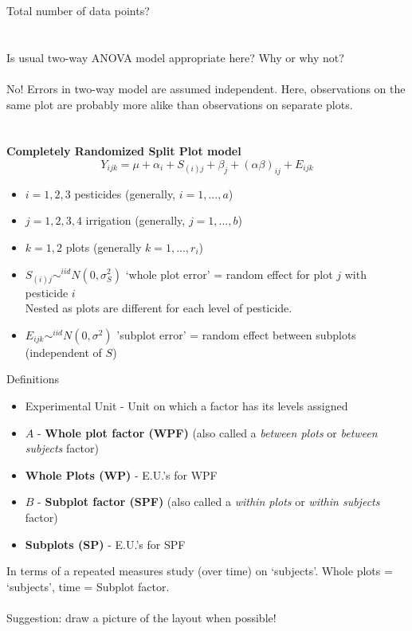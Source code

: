 Total number of data points?\\~\\~\\
Is usual two-way ANOVA model appropriate here?  Why or why not?\\~\\
No! Errors in two-way model are assumed independent.  Here, observations on the same plot are probably more alike than observations on separate plots. \\~\\~\\
\textbf{Completely Randomized Split Plot model}
$$Y_{ijk}=\mu+\alpha_i+S_{(i)j}+\beta_{j}+(\alpha\beta)_{ij}+E_{ijk}$$
\begin{itemize}
\item $i=1,2,3$ pesticides (generally, $i=1,...,a$)
\item $j=1,2,3,4$ irrigation (generally, $j=1,...,b$)
\item $k=1,2$ plots (generally $k=1,...,r_i$)
\item $S_{(i)j}\sim^{iid}N(0,\sigma^2_S)$ `whole plot error' = random effect for plot $j$ with pesticide $i$\\
Nested as plots are different for each level of pesticide.
\item $E_{ijk}\sim^{iid}N(0,\sigma^2)$ 'subplot error' = random effect between subplots  (independent of $S$)
\end{itemize}

\newpage

Definitions
\begin{itemize}
\item Experimental Unit - Unit on which a factor has its levels assigned
\item $A$ - \textbf{Whole plot factor (WPF)} (also called a {\em between plots} or {\em between subjects}  factor)
\item \textbf{Whole Plots (WP)} - E.U.'s for WPF
\item $B$ - \textbf{Subplot factor (SPF)} (also called a {\em within plots} or {\em within subjects} factor)
\item \textbf{Subplots (SP)} - E.U.'s for SPF
\end{itemize}
In terms of a repeated measures study (over time) on `subjects'.  Whole plots = `subjects', time = Subplot factor.\\~\\

Suggestion: draw a picture of the layout when possible!\\~\\~\\~\\~\\~\\~\\~\\~\\

